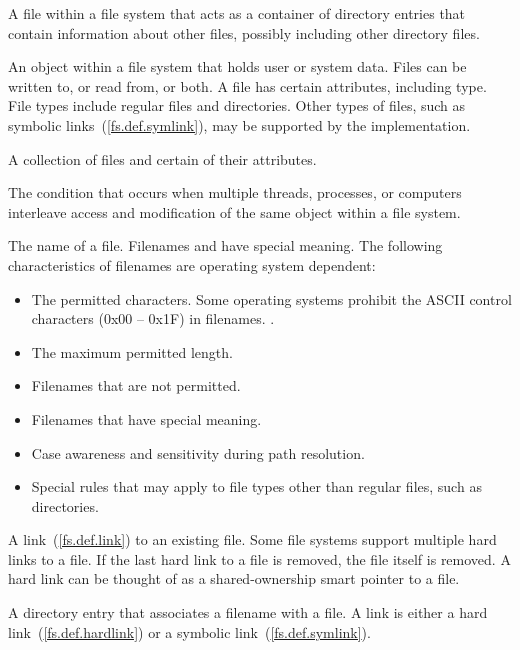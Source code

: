 A file within a file system that acts as a container of directory entries
that contain information about
other files, possibly including other directory files.

An object within a file system that holds user or system data. Files can be written to, or read from, or both. A file
has certain attributes, including type. File types include regular files
and directories. Other types of files, such as symbolic links~(\ref{fs.def.symlink}),
may be supported by the implementation.

A collection of files and certain of their attributes.

The condition that occurs
when multiple threads, processes, or computers interleave access and
modification of
the same object within a file system.

The name of a file. Filenames  and  have special meaning. The
following characteristics of filenames are operating system dependent:
\begin{itemize}
\item The permitted characters. \enterexample Some operating systems prohibit
      the ASCII control characters (0x00 -- 0x1F) in filenames. \exitexample.
\item The maximum permitted length.
\item Filenames that are not permitted.
\item Filenames that have special meaning.
\item Case awareness and sensitivity during path resolution.
\item Special rules that may apply to file types other than regular
  files, such as directories.
\end{itemize}

A link~(\ref{fs.def.link}) to an existing file. Some
file systems support multiple hard links to a file. If the last hard link to a
file is removed, the file itself is removed.
\enternote A hard link can be thought of as a shared-ownership smart
pointer to a file.\exitnote

A directory entry  that associates a
filename with a file. A link is either a hard link~(\ref{fs.def.hardlink}) or a
symbolic link~(\ref{fs.def.symlink}).

